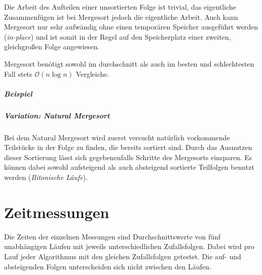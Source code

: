 \documentclass[12pt, a4paper, titlepage, hidelinks]{scrreprt}
\begin{document}
Die Arbeit des Aufteilen einer unsortierten Folge ist trivial, das eigentliche Zusammenfügen ist bei Mergesort jedoch die eigentliche Arbeit. Auch kann Mergesort nur sehr aufwändig ohne einen temporären Speicher ausgeführt werden (\textit{in-place}) und ist somit in der Regel auf den Speicherplatz einer zweiten, gleichgroßen Folge angewiesen.

Mergesort benötigt sowohl im durchschnitt als auch im besten und schlechtesten Fall stets $\mathcal{O}(n\log{}n)$ Vergleiche.

\paragraph{Beispiel}

\paragraph{Variation: Natural Mergesort} Bei dem Natural Mergesort wird zuerst versucht natürlich vorkommende Teilstücke in der Folge zu finden, die bereits sortiert sind. Durch das Ausnutzen dieser Sortierung lässt sich gegebenenfalls Schritte des Mergesorts einsparen. Es können dabei sowohl aufsteigend als auch absteigend sortierte Teilfolgen benutzt werden (\textit{Bitonische Läufe}).

\chapter{Zeitmessungen}
Die Zeiten der einzelnen Messungen sind Durchschnittswerte von fünf unabhängigen Läufen mit jeweils unterschiedlichen Zufallsfolgen. Dabei wird pro Lauf jeder Algorithmus mit den gleichen Zufallsfolgen getestet. Die auf- und absteigenden Folgen unterscheiden sich nicht zwischen den Läufen.


\end{document}
